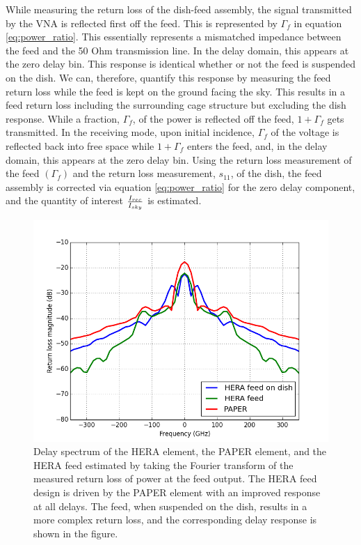 \documentclass[twocolumn]{emulateapj}
\begin{document}
While measuring the return loss of the dish-feed assembly, the signal transmitted by the VNA is reflected first off the feed. This is represented by $\Gamma_{f}$ in equation \ref{eq:power_ratio}. This essentially represents a mismatched impedance between the feed and the 50 Ohm transmission line. In the delay domain, this appears at the zero delay bin. This response is identical whether or not the feed is suspended on the dish. We can, therefore, quantify this response by measuring the feed return loss while the feed is kept on the ground facing the sky. This results in a feed return loss including the surrounding cage structure but excluding the dish response. While a fraction, $\Gamma_{f}$, of the power is reflected off the feed, $1+\Gamma_{f}$ gets transmitted. In the receiving mode, upon initial incidence, $\Gamma_{f}$ of the voltage is reflected back into free space while $1+\Gamma_{f}$ enters the feed, and, in the delay domain, this appears at the zero delay bin. Using the return loss measurement of the feed $(\Gamma_{f})$ and the return loss measurement, $s_{11}$, of the dish, the feed assembly is corrected via equation \ref{eq:power_ratio} for the zero delay component, and the quantity of interest ${I_{rec}\over I_{sky}}$ is estimated. 
%
%
\begin{figure}
\centering
\includegraphics[width=\linewidth]{plots/delay_spectrum_100_200_BH.png}
\caption{Delay spectrum of the HERA element, the PAPER element, and the HERA feed estimated by taking the Fourier transform of the measured return loss of power at the feed output. The HERA feed design is driven by the PAPER element with an improved response at all delays. The feed, when suspended on the dish, results in a more complex return loss, and the corresponding delay response is shown in the figure.} %
\label{fig:delay_spectrum}
\end{figure}
\end{document}
